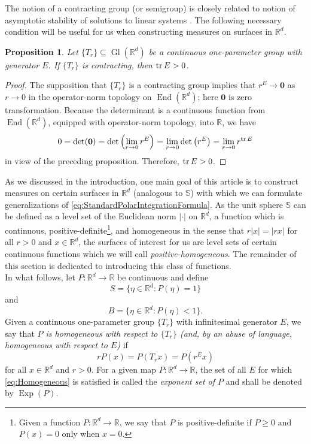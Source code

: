 \documentclass[11pt]{article}
\newtheorem{proposition}[theorem]{Proposition}
\theoremstyle{remark}
\newcommand\End{\operatorname{End}} %
\newcommand\Gl{\operatorname{Gl}} %
\newcommand\Exp{\operatorname{Exp}}
\renewcommand\det{\operatorname{det}}
\begin{document}
\noindent The notion of a contracting group (or semigroup) is closely related to notion of asymptotic stability of solutions to linear systems \cite{Braun1993}. The following necessary condition will be useful for us when constructing measures on surfaces in $\mathbb{R}^d$.

\begin{proposition}\label{prop:ContractingTrace}
Let $\{T_r\}\subseteq \Gl(\mathbb{R}^d)$ be a continuous one-parameter group with generator $E$. If $\{T_r\}$ is  contracting, then $\tr E>0$. 
\end{proposition}
\begin{proof}
The supposition that $\{T_r\}$ is a contracting group implies that $r^E\to \mathbf{0}$ as $r\to 0$ in the operator-norm topology on $\End(\mathbb{R}^d)$; here $\mathbf{0}$ is zero transformation. Because the determinant is a continuous function from $\End(\mathbb{R}^d)$, equipped with operator-norm topology, into $\mathbb{R}$, we have
\begin{equation*}
0=\det(\mathbf{0})=\det\left(\lim_{r\to 0}r^E\right)=\lim_{r\to 0}\det\left(r^E\right)=\lim_{r\to 0}r^{\tr E}
\end{equation*}
in view of the preceding proposition. Therefore, $\tr E>0$.
\end{proof}

\noindent As we discussed in the introduction, one main goal of this article is to construct measures on certain surfaces in $\mathbb{R}^d$ (analogous to $\mathbb{S}$) with which we can formulate generalizations of \eqref{eq:StandardPolarIntegrationFormula}. As the unit sphere $\mathbb{S}$ can be defined as a level set of the Euclidean norm $|\cdot|$ on $\mathbb{R}^d$, a function which is continuous,  positive-definite\footnote{Given a function $P:\mathbb{R}^d\to\mathbb{R}$, we say that $P$ is positive-definite if $P\geq 0$ and $P(x)=0$ only when $x=0$.}, and homogeneous in the sense that $r|x|=|rx|$ for all $r>0$ and $x\in\mathbb{R}^d$, the surfaces of interest for us are level sets of certain continuous functions which we will call \textit{positive-homogeneous}. The remainder of this section is dedicated to introducing this class of functions.\\

\noindent In what follows, let $P:\mathbb{R}^d\to\mathbb{R}$ be continuous and define
\begin{equation}
S=\{\eta\in\mathbb{R}^d:P(\eta)=1\}
\end{equation}
and
\begin{equation*}
B=\{\eta\in\mathbb{R}^d:P(\eta)<1\}.
\end{equation*}
Given a continuous one-parameter group $\{T_r\}$ with infinitesimal generator $E$, we say that \textit{$P$ is homogeneous with respect to $\{T_r\}$ (and, by an abuse of language, homogeneous with respect to $E$)} if
\begin{equation}\label{eq:Homogeneous}
rP(x)=P(T_rx)=P\left(r^Ex\right)
\end{equation}
for all $x\in\mathbb{R}^d$ and $r>0$. For a given map $P:\mathbb{R}^d\to\mathbb{R}$, the set of all $E$ for which \eqref{eq:Homogeneous} is satisfied is called the \textit{exponent set of $P$} and shall be denoted by $\Exp(P)$. 
\end{document}
